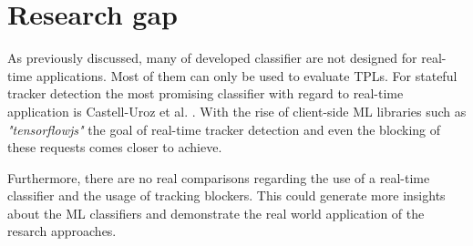 \section{Research gap}

As previously discussed, many of developed classifier are not designed for real-time applications. Most of them can only
be used to evaluate TPLs. For stateful tracker detection the most promising classifier with regard to real-time application is
Castell-Uroz et al. \cite{castell2020url}. With the rise of client-side ML libraries such as \emph{"tensorflowjs"} the goal of
real-time tracker detection and even the blocking of these requests comes closer to achieve.

Furthermore, there are no real comparisons regarding the use of a real-time classifier and the usage of tracking blockers. This could
generate more insights about the ML classifiers and demonstrate the real world application of the resarch approaches.

